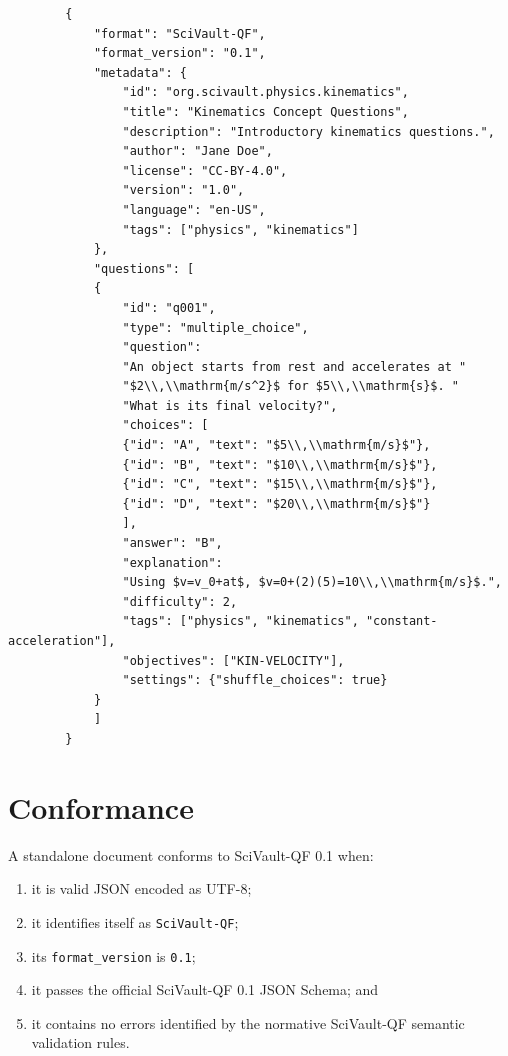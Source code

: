 \documentclass[11pt]{article}
\begin{document}
	\begin{lstlisting}
		{
			"format": "SciVault-QF",
			"format_version": "0.1",
			"metadata": {
				"id": "org.scivault.physics.kinematics",
				"title": "Kinematics Concept Questions",
				"description": "Introductory kinematics questions.",
				"author": "Jane Doe",
				"license": "CC-BY-4.0",
				"version": "1.0",
				"language": "en-US",
				"tags": ["physics", "kinematics"]
			},
			"questions": [
			{
				"id": "q001",
				"type": "multiple_choice",
				"question":
				"An object starts from rest and accelerates at "
				"$2\\,\\mathrm{m/s^2}$ for $5\\,\\mathrm{s}$. "
				"What is its final velocity?",
				"choices": [
				{"id": "A", "text": "$5\\,\\mathrm{m/s}$"},
				{"id": "B", "text": "$10\\,\\mathrm{m/s}$"},
				{"id": "C", "text": "$15\\,\\mathrm{m/s}$"},
				{"id": "D", "text": "$20\\,\\mathrm{m/s}$"}
				],
				"answer": "B",
				"explanation":
				"Using $v=v_0+at$, $v=0+(2)(5)=10\\,\\mathrm{m/s}$.",
				"difficulty": 2,
				"tags": ["physics", "kinematics", "constant-acceleration"],
				"objectives": ["KIN-VELOCITY"],
				"settings": {"shuffle_choices": true}
			}
			]
		}
	\end{lstlisting}
	
	\section{Conformance}
	
	A standalone document conforms to SciVault-QF 0.1 when:
	
	\begin{enumerate}
		\item it is valid JSON encoded as UTF-8;
		\item it identifies itself as \texttt{SciVault-QF};
		\item its \texttt{format\_version} is \texttt{0.1};
		\item it passes the official SciVault-QF 0.1 JSON Schema; and
		\item it contains no errors identified by the normative SciVault-QF
		semantic validation rules.
	\end{enumerate}
	
\end{document}
